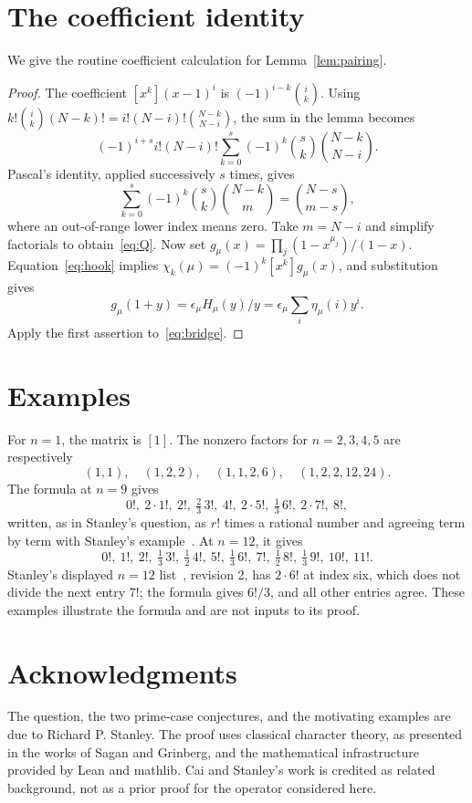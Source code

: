 \documentclass[11pt]{article}
\theoremstyle{remark}
\begin{document}
\begin{appendices}
\section{The coefficient identity}\label{app:pairing}
We give the routine coefficient calculation for Lemma~\ref{lem:pairing}.
\begin{proof}
The coefficient $[x^k](x-1)^i$ is $(-1)^{i-k}\binom ik$.
Using
$k!\binom ik(N-k)!=i!(N-i)!\binom{N-k}{N-i}$,
the sum in the lemma becomes
\[
 (-1)^{i+s}i!(N-i)!
 \sum_{k=0}^s(-1)^k\binom sk\binom{N-k}{N-i}.
\]
Pascal's identity, applied successively $s$ times, gives
\[
 \sum_{k=0}^s(-1)^k\binom sk\binom{N-k}{m}
       =\binom{N-s}{m-s},
\]
where an out-of-range lower index means zero. Take $m=N-i$ and
simplify factorials to obtain~\eqref{eq:Q}.
Now set $g_\mu(x)=\prod_j(1-x^{\mu_j})/(1-x)$.
Equation~\eqref{eq:hook} implies $\chi_k(\mu)=(-1)^k[x^k]g_\mu(x)$,
and substitution gives
\[
 g_\mu(1+y)=\epsilon_\mu H_\mu(y)/y
            =\epsilon_\mu\sum_i\eta_\mu(i)y^i.
\]
Apply the first assertion to~\eqref{eq:bridge}.
\end{proof}

\section{Examples}\label{sec:examples}
For $n=1$, the matrix is $[1]$. The nonzero factors for $n=2,3,4,5$
are respectively
\[
 (1,1),\quad(1,2,2),\quad(1,1,2,6),\quad(1,2,2,12,24).
\]
The formula at $n=9$ gives
\[
 0!,\ 2\cdot1!,\ 2!,\ \tfrac23\,3!,\ 4!,\ 2\cdot5!,\
 \tfrac13\,6!,\ 2\cdot7!,\ 8!,
\]
written, as in Stanley's question, as $r!$ times a rational number and
agreeing term by term with Stanley's example~\cite{StanleyQuestion}.
At $n=12$, it gives
\[
 0!,\ 1!,\ 2!,\ \tfrac13\,3!,\ \tfrac12\,4!,\ 5!,\
 \tfrac13\,6!,\ 7!,\ \tfrac12\,8!,\ \tfrac13\,9!,\ 10!,\ 11!.
\]
Stanley's displayed $n=12$ list~\cite{StanleyQuestion}, revision 2, has
$2\cdot6!$ at index six, which does not divide the next entry $7!$; the
formula gives $6!/3$, and all other entries agree. These examples illustrate
the formula and are not inputs to its proof.

\end{appendices}

\section*{Acknowledgments}
The question, the two prime-case conjectures, and the motivating
examples are due to Richard P. Stanley. The proof uses classical
character theory, as presented in the works of Sagan and Grinberg,
and the mathematical infrastructure provided by Lean and mathlib.
Cai and Stanley's work is credited as related
background, not as a prior proof for the operator considered here.
\end{document}

